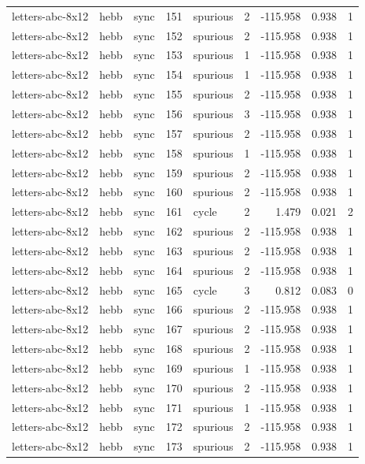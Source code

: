 \begin{tabular}{lllrlrrrr}
letters-abc-8x12 & hebb & sync & 151 & spurious & 2 & -115.958 & 0.938 & 1 \\
letters-abc-8x12 & hebb & sync & 152 & spurious & 2 & -115.958 & 0.938 & 1 \\
letters-abc-8x12 & hebb & sync & 153 & spurious & 1 & -115.958 & 0.938 & 1 \\
letters-abc-8x12 & hebb & sync & 154 & spurious & 1 & -115.958 & 0.938 & 1 \\
letters-abc-8x12 & hebb & sync & 155 & spurious & 2 & -115.958 & 0.938 & 1 \\
letters-abc-8x12 & hebb & sync & 156 & spurious & 3 & -115.958 & 0.938 & 1 \\
letters-abc-8x12 & hebb & sync & 157 & spurious & 2 & -115.958 & 0.938 & 1 \\
letters-abc-8x12 & hebb & sync & 158 & spurious & 1 & -115.958 & 0.938 & 1 \\
letters-abc-8x12 & hebb & sync & 159 & spurious & 2 & -115.958 & 0.938 & 1 \\
letters-abc-8x12 & hebb & sync & 160 & spurious & 2 & -115.958 & 0.938 & 1 \\
letters-abc-8x12 & hebb & sync & 161 & cycle & 2 & 1.479 & 0.021 & 2 \\
letters-abc-8x12 & hebb & sync & 162 & spurious & 2 & -115.958 & 0.938 & 1 \\
letters-abc-8x12 & hebb & sync & 163 & spurious & 2 & -115.958 & 0.938 & 1 \\
letters-abc-8x12 & hebb & sync & 164 & spurious & 2 & -115.958 & 0.938 & 1 \\
letters-abc-8x12 & hebb & sync & 165 & cycle & 3 & 0.812 & 0.083 & 0 \\
letters-abc-8x12 & hebb & sync & 166 & spurious & 2 & -115.958 & 0.938 & 1 \\
letters-abc-8x12 & hebb & sync & 167 & spurious & 2 & -115.958 & 0.938 & 1 \\
letters-abc-8x12 & hebb & sync & 168 & spurious & 2 & -115.958 & 0.938 & 1 \\
letters-abc-8x12 & hebb & sync & 169 & spurious & 1 & -115.958 & 0.938 & 1 \\
letters-abc-8x12 & hebb & sync & 170 & spurious & 2 & -115.958 & 0.938 & 1 \\
letters-abc-8x12 & hebb & sync & 171 & spurious & 1 & -115.958 & 0.938 & 1 \\
letters-abc-8x12 & hebb & sync & 172 & spurious & 2 & -115.958 & 0.938 & 1 \\
letters-abc-8x12 & hebb & sync & 173 & spurious & 2 & -115.958 & 0.938 & 1 \\

\end{tabular}
